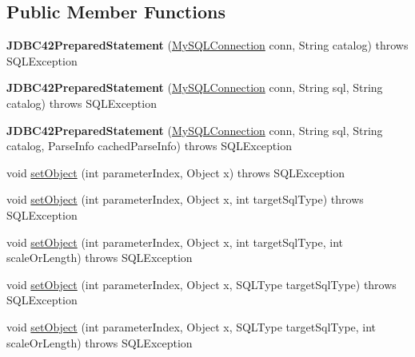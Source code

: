 \subsection*{Public Member Functions}
\begin{DoxyCompactItemize}
\item 
\mbox{\label{classcom_1_1mysql_1_1jdbc_1_1_j_d_b_c42_prepared_statement_a1817d6c33848c6e348a7c63f53f19ea0}} 
{\bfseries J\+D\+B\+C42\+Prepared\+Statement} (\mbox{\hyperlink{interfacecom_1_1mysql_1_1jdbc_1_1_my_s_q_l_connection}{My\+S\+Q\+L\+Connection}} conn, String catalog)  throws S\+Q\+L\+Exception 
\item 
\mbox{\label{classcom_1_1mysql_1_1jdbc_1_1_j_d_b_c42_prepared_statement_a7c03085990cb464e77f0eea59bf42093}} 
{\bfseries J\+D\+B\+C42\+Prepared\+Statement} (\mbox{\hyperlink{interfacecom_1_1mysql_1_1jdbc_1_1_my_s_q_l_connection}{My\+S\+Q\+L\+Connection}} conn, String sql, String catalog)  throws S\+Q\+L\+Exception 
\item 
\mbox{\label{classcom_1_1mysql_1_1jdbc_1_1_j_d_b_c42_prepared_statement_a4a59101cb89565cfb676cbe826aa11f7}} 
{\bfseries J\+D\+B\+C42\+Prepared\+Statement} (\mbox{\hyperlink{interfacecom_1_1mysql_1_1jdbc_1_1_my_s_q_l_connection}{My\+S\+Q\+L\+Connection}} conn, String sql, String catalog, Parse\+Info cached\+Parse\+Info)  throws S\+Q\+L\+Exception 
\item 
void \mbox{\hyperlink{classcom_1_1mysql_1_1jdbc_1_1_j_d_b_c42_prepared_statement_a46b5e2046e9ffeed2aaba0002fd240cf}{set\+Object}} (int parameter\+Index, Object x)  throws S\+Q\+L\+Exception 
\item 
void \mbox{\hyperlink{classcom_1_1mysql_1_1jdbc_1_1_j_d_b_c42_prepared_statement_a2c0c07e6b1b8ad723a61f3e0245981af}{set\+Object}} (int parameter\+Index, Object x, int target\+Sql\+Type)  throws S\+Q\+L\+Exception 
\item 
void \mbox{\hyperlink{classcom_1_1mysql_1_1jdbc_1_1_j_d_b_c42_prepared_statement_aa3bf75fe600cd4b375a765ea92ceead1}{set\+Object}} (int parameter\+Index, Object x, int target\+Sql\+Type, int scale\+Or\+Length)  throws S\+Q\+L\+Exception 
\item 
void \mbox{\hyperlink{classcom_1_1mysql_1_1jdbc_1_1_j_d_b_c42_prepared_statement_ad8c8705a41d1a0df10c537ca9f604c11}{set\+Object}} (int parameter\+Index, Object x, S\+Q\+L\+Type target\+Sql\+Type)  throws S\+Q\+L\+Exception 
\item 
void \mbox{\hyperlink{classcom_1_1mysql_1_1jdbc_1_1_j_d_b_c42_prepared_statement_afd7aa860a6a3a3bf327efd997b82c52f}{set\+Object}} (int parameter\+Index, Object x, S\+Q\+L\+Type target\+Sql\+Type, int scale\+Or\+Length)  throws S\+Q\+L\+Exception 
\end{DoxyCompactItemize}
